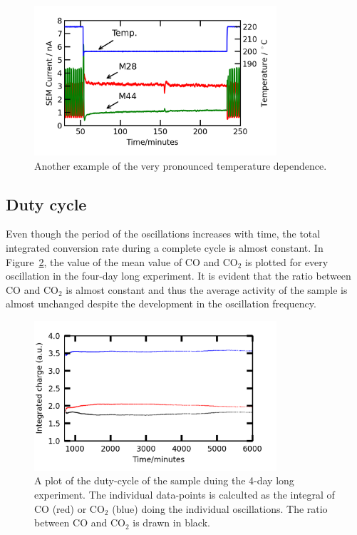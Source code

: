 \documentclass[8.5pt,twoside,twocolumn]{article}
\begin{document}
\begin{figure}[h]
\centering
  \includegraphics[width=9cm]{temperature_dependence_supplemental.png}
  \caption{Another example of the very pronounced temperature dependence.}
  \label{fgr:temperature_dependence_supplemental}
\end{figure}

\subsection{Duty cycle}
Even though the period of the oscillations increases with time, the total integrated conversion rate during a complete cycle is almost constant. In Figure~\ref{fgr:duty_cycles_supplemental}, the value of the mean value of CO and CO$_2$ is plotted for every oscillation in the four-day long experiment. It is evident that the ratio between CO and CO$_2$ is almost constant and thus the average activity of the sample is almost unchanged despite the development in the oscillation frequency.


\begin{figure}[h]
\centering
  \includegraphics[width=9cm]{duty_cycles_long_measurement_supplemental.png}
  \caption{A plot of the duty-cycle of the sample duing the 4-day long experiment. The individual data-points is calculted as the integral of CO (red) or CO$_2$ (blue) doing the individual oscillations. The ratio between CO and CO$_2$ is drawn in black.}
  \label{fgr:duty_cycles_supplemental}
\end{figure}
\end{document}
